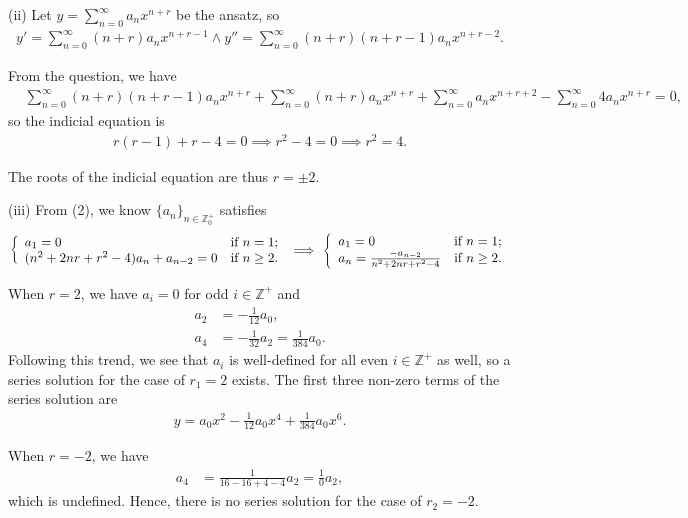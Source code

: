 \documentclass[12pt]{amsart}
\theoremstyle{plain}
\theoremstyle{definition}
\def\mb{\mathbb}
\newcommand{\tu}{\textup}
\newcommand{\RA}{\implies}
\begin{document}
(ii) Let $\displaystyle y=\sum_{n=0}^\infty a_nx^{n+r}$ be the ansatz, so
\begin{align*}
	y'=\sum_{n=0}^\infty(n+r)a_nx^{n+r-1}\land 
	y''=\sum_{n=0}^\infty(n+r)(n+r-1)a_nx^{n+r-2}.
\end{align*}

From the question, we have
\begin{align*}\tag{2}
	&\sum_{n=0}^\infty(n+r)(n+r-1)a_nx^{n+r}+\sum_{n=0}^\infty(n+r)a_nx^{n+r}+\sum_{n=0}^\infty a_nx^{n+r+2}-\sum_{n=0}^\infty 4a_nx^{n+r}=0,
\end{align*}
so the indicial equation is
\begin{align*}
r(r-1)+r-4=0\RA r^2-4=0\RA r^2=4.
\end{align*}

The roots of the indicial equation are thus $r=\pm 2$.

(iii) From (2), we know $\{a_n\}_{n\in\mb Z^+_0}$ satisfies
\begin{align*}
	\left\{
	\begin{array}{ll}
		a_1=0 & \tu{if $n=1$;}\\
		(n^2+2nr+r^2-4)a_n+a_{n-2}=0 & \tu{if $n\geq2$.}\\
	\end{array}
	\right.\RA\left\{
	\begin{array}{ll}
		a_1=0 & \tu{if $n=1$;}\\
		a_n=\frac{-a_{n-2}}{n^2+2nr+r^2-4} & \tu{if $n\geq2$.}\\
	\end{array}
	\right.
\end{align*}

When $r=2$, we have $a_i=0$ for odd $i\in\mb Z^+$ and 
\begin{align*}
	a_2&=-\frac1{12}a_0,\\
	a_4&=-\frac1{32}a_2=\frac1{384}a_0.
\end{align*}
Following this trend, we see that $a_i$ is well-defined for all even $i\in\mb Z^+$ as well,  
so a series solution for the case of $r_1=2$ exists. The first three non-zero terms of the series solution are
\begin{align*}
	y=a_0x^2-\frac1{12}a_0x^4+\frac1{384}a_0x^6.
\end{align*} 

When $r=-2$, we have
\begin{align*}
	a_4&=\frac{1}{16-16+4-4}a_2=\frac10a_2,
\end{align*}
which is undefined. Hence, there is no series solution for the case of $r_2=-2$.
\end{document}
